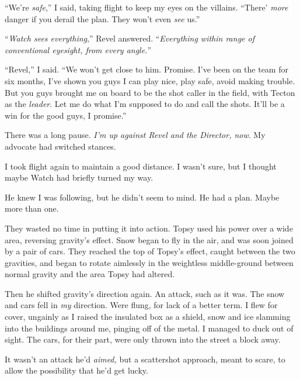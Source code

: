 ``We're \emph{safe},'' I said, taking flight to keep my eyes on the villains.  ``There' \emph{more} danger if you derail the plan.  They won't even \emph{see} us.''



``\emph{Watch sees everything},'' Revel answered.  ``\emph{Everything within range of conventional eyesight, from every angle.}''



``Revel,'' I said.  ``We won't get close to him.  Promise.  I've been on the team for six months, I've shown you guys I can play nice, play safe, avoid making trouble.  But you guys brought me on board to be the shot caller in the field, with Tecton as the \emph{leader}.  Let me do what I'm supposed to do and call the shots.  It'll be a win for the good guys, I promise.''



There was a long pause.  \emph{I'm up against Revel and the Director, now}.  My advocate had switched stances.



I took flight again to maintain a good distance.  I wasn't sure, but I thought maybe Watch had briefly turned my way.



He knew I was following, but he didn't seem to mind.  He had a plan.  Maybe more than one.



They wasted no time in putting it into action.  Topsy used his power over a wide area, reversing gravity's effect.  Snow began to fly in the air, and was soon joined by a pair of cars.  They reached the top of Topsy's effect, caught between the two gravities, and began to rotate aimlessly in the weightless middle-ground between normal gravity and the area Topsy had altered.



Then he shifted gravity's direction again.  An attack, such as it was.  The snow and cars fell in \emph{my} direction.  Were flung, for lack of a better term.  I flew for cover, ungainly as I raised the insulated box as a shield, snow and ice slamming into the buildings around me, pinging off of the metal.  I managed to duck out of sight.  The cars, for their part, were only thrown into the street a block away.



It wasn't an attack he'd \emph{aimed,} but a scattershot approach, meant to scare, to allow the possibility that he'd get lucky.




